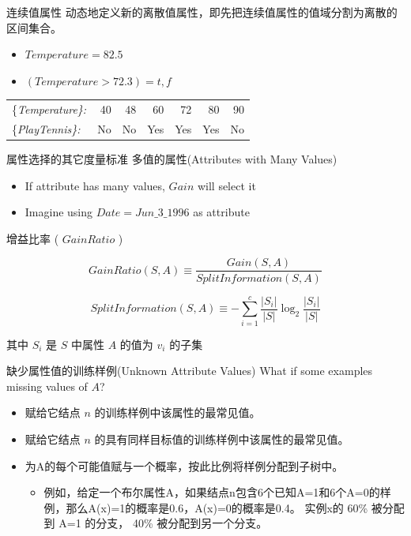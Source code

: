 \documentclass[presentation]{beamer}
\begin{document}
\begin{frame}[label={sec:org623ca20}]{连续值属性}
动态地定义新的离散值属性，即先把连续值属性的值域分割为离散的区间集合。
\begin{itemize}
\item \(Temperature = 82.5\)
\item \((Temperature>72.3) = t,f\)
\end{itemize}

\begin{center}
\begin{tabular}{lrrrrrr}
\{\em Temperature\}: & 40 & 48 & 60 & 72 & 80 & 90\\
\{\em PlayTennis\}: & No & No & Yes & Yes & Yes & No\\
\end{tabular}
\end{center}
\end{frame}
\begin{frame}[label={sec:orga11b047}]{属性选择的其它度量标准}
多值的属性(Attributes with Many Values)
\begin{itemize}
\item If attribute has many values, \(Gain\) will select it
\item Imagine using \(Date = Jun\_3\_1996\) as attribute
\end{itemize}

增益比率 ( \(GainRatio\) )

\[GainRatio(S,A) \equiv \frac{Gain(S,A)}{SplitInformation(S,A)} \]

\[ SplitInformation(S,A) \equiv - \sum_{i=1}^{c} \frac{|S_{i}|}{|S|} \log_{2}\frac{|S_{i}|}{|S|} \]

其中 \(S_{i}\)  是 \(S\) 中属性 \(A\) 的值为 \(v_{i}\) 的子集
\end{frame}
\begin{frame}[label={sec:org14ae99f}]{缺少属性值的训练样例(Unknown Attribute Values)}
What if some examples missing values of \(A\)?


\begin{itemize}
\item 赋给它结点 \(n\) 的训练样例中该属性的最常见值。
\item 赋给它结点 \(n\) 的具有同样目标值的训练样例中该属性的最常见值。
\item 为A的每个可能值赋与一个概率，按此比例将样例分配到子树中。
\begin{itemize}
\item 例如，给定一个布尔属性A，如果结点n包含6个已知A=1和6个A=0的样例，那么A(x)=1的概率是0.6，A(x)=0的概率是0.4。
实例x的 60\% 被分配到 A=1 的分支，
40\% 被分配到另一个分支。
\end{itemize}
\end{itemize}
\end{frame}
\end{document}
